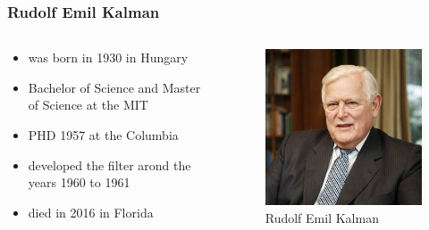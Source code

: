 \documentclass{beamer}
\begin{document}
\begin{frame}
    \frametitle{Rudolf Emil Kalman}
    \begin{columns}
        \begin{column}{0.7\textwidth}
           \begin{itemize}
            \item was born in 1930 in Hungary
            \item Bachelor of Science and Master of Science at the MIT
            \item PHD 1957 at the Columbia
            \item developed the filter arond the years 1960 to 1961
            \item died in 2016 in Florida
           \end{itemize} 
        \end{column}
        \begin{column}{0.3\textwidth}
            \begin{figure}
                \centering
                \includegraphics[width=1\textwidth]{images/graphics/kalman_bre.jpeg}
                \caption{Rudolf Emil Kalman}
            \end{figure}
        \end{column}
    \end{columns}
\end{frame}
\end{document}
